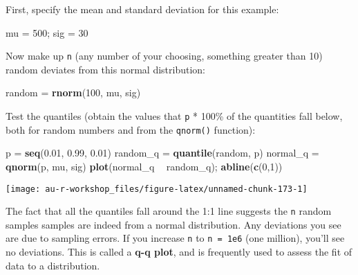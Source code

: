 \documentclass[]{book}
\newenvironment{Shaded}{\begin{snugshade}}{\end{snugshade}}
\newcommand{\KeywordTok}[1]{\textcolor[rgb]{0.13,0.29,0.53}{\textbf{#1}}}
\newcommand{\DecValTok}[1]{\textcolor[rgb]{0.00,0.00,0.81}{#1}}
\newcommand{\FloatTok}[1]{\textcolor[rgb]{0.00,0.00,0.81}{#1}}
\newcommand{\StringTok}[1]{\textcolor[rgb]{0.31,0.60,0.02}{#1}}
\newcommand{\OperatorTok}[1]{\textcolor[rgb]{0.81,0.36,0.00}{\textbf{#1}}}
\newcommand{\NormalTok}[1]{#1}
\theoremstyle{definition}
\theoremstyle{definition}
\theoremstyle{definition}
\theoremstyle{remark}
\begin{document}
First, specify the mean and standard deviation for this example:

\begin{Shaded}
\begin{Highlighting}[]
\NormalTok{mu =}\StringTok{ }\DecValTok{500}\NormalTok{; sig =}\StringTok{ }\DecValTok{30}
\end{Highlighting}
\end{Shaded}

Now make up \texttt{n} (any number of your choosing, something greater
than 10) random deviates from this normal distribution:

\begin{Shaded}
\begin{Highlighting}[]
\NormalTok{random =}\StringTok{ }\KeywordTok{rnorm}\NormalTok{(}\DecValTok{100}\NormalTok{, mu, sig)}
\end{Highlighting}
\end{Shaded}

Test the quantiles (obtain the values that \texttt{p} * 100\% of the
quantities fall below, both for random numbers and from the
\texttt{qnorm()} function):

\begin{Shaded}
\begin{Highlighting}[]
\NormalTok{p =}\StringTok{ }\KeywordTok{seq}\NormalTok{(}\FloatTok{0.01}\NormalTok{, }\FloatTok{0.99}\NormalTok{, }\FloatTok{0.01}\NormalTok{)}
\NormalTok{random_q =}\StringTok{ }\KeywordTok{quantile}\NormalTok{(random, p)}
\NormalTok{normal_q =}\StringTok{ }\KeywordTok{qnorm}\NormalTok{(p, mu, sig)}
\KeywordTok{plot}\NormalTok{(normal_q }\OperatorTok{~}\StringTok{ }\NormalTok{random_q); }\KeywordTok{abline}\NormalTok{(}\KeywordTok{c}\NormalTok{(}\DecValTok{0}\NormalTok{,}\DecValTok{1}\NormalTok{))}
\end{Highlighting}
\end{Shaded}

\begin{center}\texttt{[image: au-r-workshop\_files/figure-latex/unnamed-chunk-173-1]} \end{center}

The fact that all the quantiles fall around the 1:1 line suggests the
\texttt{n} random samples samples are indeed from a normal distribution.
Any deviations you see are due to sampling errors. If you increase
\texttt{n} to \texttt{n\ =\ 1e6} (one million), you'll see no
deviations. This is called a \textbf{q-q plot}, and is frequently used
to assess the fit of data to a distribution.
\end{document}
